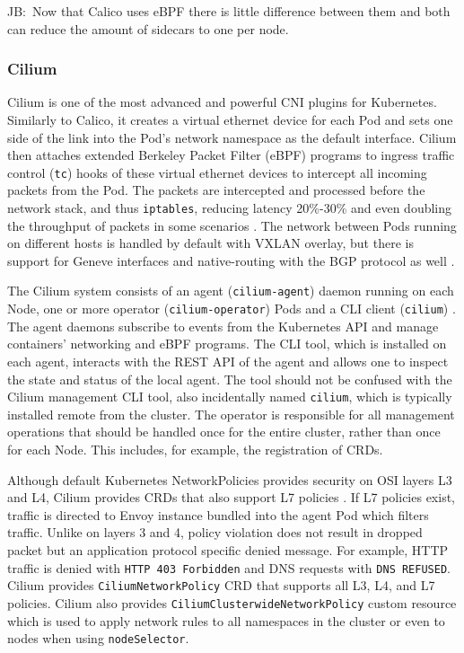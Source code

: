 \documentclass[english, 12pt, a4paper, sci, utf8, a-2b, online]{aaltothesis}
\newcommand{\mycomment}[3]{\textcolor{#1}{#2:~#3}}
\newcommand{\jb}[1]{\noindent\mycomment{aaltoRed}{JB}{#1}}
\begin{document}
\jb{Now that Calico uses eBPF there is little difference between them and both can reduce the amount of sidecars to one per node.}

\subsubsection{Cilium}

Cilium \cite{cilium} is one of the most advanced and powerful CNI plugins for Kubernetes.
Similarly to Calico, it creates a virtual ethernet device for each Pod and sets one side of the link into the Pod's network namespace \cite{cilium-tkng} as the default interface.
Cilium then attaches extended Berkeley Packet Filter (eBPF) programs to ingress traffic control (\texttt{tc}) hooks of these virtual ethernet devices to intercept all incoming packets from the Pod.
The packets are intercepted and processed before the network stack, and thus \texttt{iptables}, reducing latency 20\%-30\% and even doubling the throughput of packets in some scenarios \cite{budigiri2021network}.
The network between Pods running on different hosts is handled by default with VXLAN overlay, but there is support for Geneve interfaces and native-routing with the BGP protocol as well \cite{cilium}.

The Cilium system consists of an agent (\texttt{cilium-agent}) daemon running on each Node, one or more operator (\texttt{cilium-operator}) Pods and a CLI client (\texttt{cilium}) \cite{cilium-components}.
The agent daemons subscribe to events from the Kubernetes API and manage containers' networking and eBPF programs.
The CLI tool, which is installed on each agent, interacts with the REST API of the agent and allows one to inspect the state and status of the local agent.
The tool should not be confused with the Cilium management CLI tool, also incidentally named \texttt{cilium}, which is typically installed remote from the cluster.
The operator is responsible for all management operations that should be handled once for the entire cluster, rather than once for each Node.
This includes, for example, the registration of CRDs.

Although default Kubernetes NetworkPolicies provides security on OSI layers L3 and L4, Cilium provides CRDs that also support L7 policies \cite{cilium-policy-language}.
If L7 policies exist, traffic is directed to Envoy instance bundled into the agent Pod which filters traffic.
Unlike on layers 3 and 4, policy violation does not result in dropped packet but an application protocol specific denied message.
For example, HTTP traffic is denied with \texttt{HTTP 403 Forbidden} and DNS requests with \texttt{DNS REFUSED}.
Cilium provides \texttt{CiliumNetworkPolicy} CRD that supports all L3, L4, and L7 policies.
Cilium also provides \texttt{CiliumClusterwideNetworkPolicy} custom resource which is used to apply network rules to all namespaces in the cluster or even to nodes when using \texttt{nodeSelector}.
\end{document}
